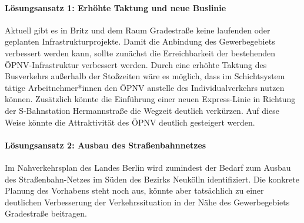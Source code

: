 \paragraph{Lösungsansatz 1: Erhöhte Taktung und neue Buslinie}
Aktuell gibt es in Britz und dem Raum Gradestraße keine laufenden oder geplanten Infrastrukturprojekte. Damit die Anbindung des Gewerbegebiets verbessert werden kann, sollte zunächst die Erreichbarkeit der bestehenden ÖPNV-Infrastruktur verbessert werden. Durch eine erhöhte Taktung des Busverkehrs außerhalb der Stoßzeiten wäre es möglich, dass im Schichtsystem tätige Arbeitnehmer*innen den ÖPNV anstelle des Individualverkehrs nutzen können. Zusätzlich könnte die Einführung einer neuen Express-Linie in Richtung der S-Bahnstation Hermannstraße die Wegzeit deutlich verkürzen. Auf diese Weise könnte die Attraktivität des ÖPNV deutlich gesteigert werden.

\paragraph{Lösungsansatz 2: Ausbau des Straßenbahnnetzes}
Im Nahverkehrsplan des Landes Berlin wird zumindest der Bedarf zum Ausbau des Straßenbahn-Netzes im Süden des Bezirks Neukölln identifiziert. Die konkrete Planung des Vorhabens steht noch aus, könnte aber tatsächlich zu einer deutlichen Verbesserung der Verkehrssituation in der Nähe des Gewerbegebiets Gradestraße beitragen.

